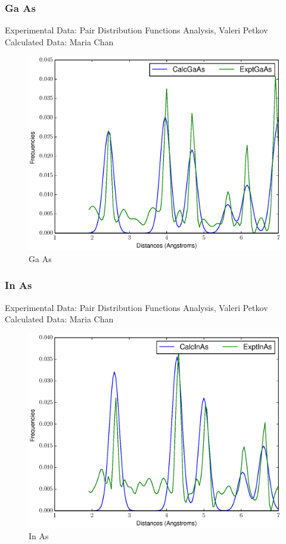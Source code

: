 \documentclass[12pt,letterpaper]{article}
\begin{document}
\subsubsection{Ga As}
\noindent Experimental Data: Pair Distribution Functions Analysis, Valeri
Petkov\\
\noindent Calculated Data: Maria Chan\\
\begin{figure}[ht]
  \begin{center}
    \includegraphics[scale=0.7]{figs/gaas_pdf_comparison.eps}
    \caption{Ga As}
  \end{center}
\end{figure}

\subsubsection{In As}
\noindent Experimental Data: Pair Distribution Functions Analysis, Valeri
Petkov\\
\noindent Calculated Data: Maria Chan\\
\begin{figure}[ht]
  \begin{center}
    \includegraphics[scale=0.7]{figs/inas_pdf_comparison.eps}
    \caption{In As}
  \end{center}
\end{figure}
\end{document}

